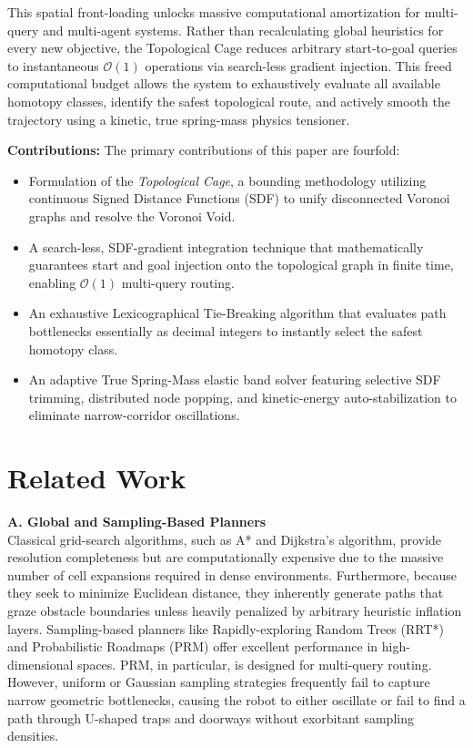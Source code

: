 \documentclass[letterpaper, 10 pt, conference]{IEEEtran}
\begin{document}
This spatial front-loading unlocks massive computational amortization for multi-query and multi-agent systems. Rather than recalculating global heuristics for every new objective, the Topological Cage reduces arbitrary start-to-goal queries to instantaneous $\mathcal{O}(1)$ operations via search-less gradient injection. This freed computational budget allows the system to exhaustively evaluate all available homotopy classes, identify the safest topological route, and actively smooth the trajectory using a kinetic, true spring-mass physics tensioner.

\textbf{Contributions:} The primary contributions of this paper are fourfold:
\begin{itemize}
    \item Formulation of the \textit{Topological Cage}, a bounding methodology utilizing continuous Signed Distance Functions (SDF) to unify disconnected Voronoi graphs and resolve the Voronoi Void.
    \item A search-less, SDF-gradient integration technique that mathematically guarantees start and goal injection onto the topological graph in finite time, enabling $\mathcal{O}(1)$ multi-query routing.
    \item An exhaustive Lexicographical Tie-Breaking algorithm that evaluates path bottlenecks essentially as decimal integers to instantly select the safest homotopy class.
    \item An adaptive True Spring-Mass elastic band solver featuring selective SDF trimming, distributed node popping, and kinetic-energy auto-stabilization to eliminate narrow-corridor oscillations.
\end{itemize}

\section{Related Work}

\textbf{A. Global and Sampling-Based Planners} \\
Classical grid-search algorithms, such as A* and Dijkstra's algorithm, provide resolution completeness but are computationally expensive due to the massive number of cell expansions required in dense environments. Furthermore, because they seek to minimize Euclidean distance, they inherently generate paths that graze obstacle boundaries unless heavily penalized by arbitrary heuristic inflation layers. Sampling-based planners like Rapidly-exploring Random Trees (RRT*) and Probabilistic Roadmaps (PRM) offer excellent performance in high-dimensional spaces. PRM, in particular, is designed for multi-query routing. However, uniform or Gaussian sampling strategies frequently fail to capture narrow geometric bottlenecks, causing the robot to either oscillate or fail to find a path through U-shaped traps and doorways without exorbitant sampling densities.
\end{document}
